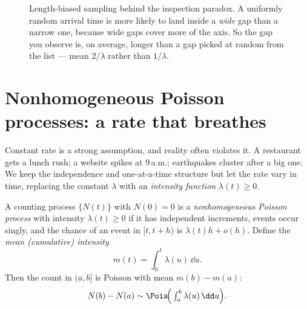 \begin{figure}[H]
\centering
{}
\caption{Length-biased sampling behind the inspection paradox. A uniformly
random arrival time is more likely to land inside a \emph{wide} gap than a narrow
one, because wide gaps cover more of the axis. So the gap you observe is, on
average, longer than a gap picked at random from the list --- mean $2/\lambda$
rather than $1/\lambda$.}
\label{ch25:fig-inspection}
\end{figure}

\section{Nonhomogeneous Poisson processes: a rate that breathes}
\label{ch25:nonhomogeneous}

Constant rate is a strong assumption, and reality often violates it. A restaurant
gets a lunch rush; a website spikes at 9\,a.m.; earthquakes cluster after a big
one. We keep the independence and one-at-a-time structure but let the rate vary
in time, replacing the constant $\lambda$ with an \emph{intensity function}
$\lambda(t) \ge 0$.

\begin{definition}
\label{ch25:def-nonhomogeneous}
A counting process $\{N(t)\}$ with $N(0)=0$ is a \emph{nonhomogeneous Poisson
process} with intensity $\lambda(t) \ge 0$ if it has independent increments,
events occur singly, and the chance of an event in $[t, t+h)$ is $\lambda(t)h +
o(h)$. Define the \emph{mean (cumulative) intensity}
\[
m(t) = \int_0^t \lambda(u)\,\dd u.
\]
Then the count in $(a,b]$ is Poisson with mean $m(b)-m(a)$:
\[
N(b)-N(a) \sim \Pois\!\Big(\textstyle\int_a^b \lambda(u)\,\dd u\Big).
\]
\end{definition}

